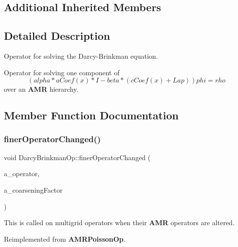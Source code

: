 \subsection*{Additional Inherited Members}


\subsection{Detailed Description}
Operator for solving the Darcy-\/\+Brinkman equation. 

Operator for solving one component of \[ (alpha * aCoef(x) * I - beta * (cCoef(x) + Lap) ) phi = rho \] over an \textbf{ A\+MR} hierarchy. 

\subsection{Member Function Documentation}
\mbox{\label{class_darcy_brinkman_op_ac6da9fd6f61b40c42b3a94b645c21e35}} 
\subsubsection{\texorpdfstring{finer\+Operator\+Changed()}{finerOperatorChanged()}}
{\footnotesize\ttfamily void Darcy\+Brinkman\+Op\+::finer\+Operator\+Changed (\begin{DoxyParamCaption}\item[{const \textbf{ M\+G\+Level\+Op}$<$ \textbf{ Level\+Data}$<$ \textbf{ F\+Array\+Box} $>$ $>$ \&}]{a\+\_\+operator,  }\item[{int}]{a\+\_\+coarsening\+Factor }\end{DoxyParamCaption})\hspace{0.3cm}{\ttfamily [virtual]}}

This is called on multigrid operators when their \textbf{ A\+MR} operators are altered. 

Reimplemented from \textbf{ A\+M\+R\+Poisson\+Op}.

\mbox{\label{class_darcy_brinkman_op_adfd7590e98c5edd78140265bb05eef17}} 
